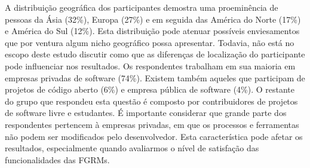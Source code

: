 \begin{table}[htpb]
\centering
{}
\caption{Função desempenhada pelos participantes}
\label{tab:grafico_melhorias_fgrm_funcao_particantes}
\end{table}

A distribuição geográfica dos participantes demostra uma proeminência de pessoas
da Ásia (32\%), Europa (27\%) e em seguida das América do Norte (17\%) e América
do Sul (12\%). Esta distribuição pode atenuar possíveis enviesamentos que por
ventura algum nicho geográfico possa apresentar. Todavia, não está no escopo
deste estudo discutir como que as diferenças de localização do participante pode
influenciar nos resultados. Os respondentes trabalham em sua maioria em empresas
privadas de software (74\%). Existem também aqueles que participam de projetos
de código aberto (6\%) e empresa pública de software (4\%). O restante do grupo
que respondeu esta questão é composto por contribuidores de projetos de software
livre e estudantes. É importante considerar que grande parte dos respondentes
pertencem à empresas privadas, em que os processos e ferramentas não podem ser
modificados pelo desenvolvedor. Esta característica pode afetar os resultados,
especialmente quando avaliarmos o nível de satisfação das funcionalidades das
FGRMs.




